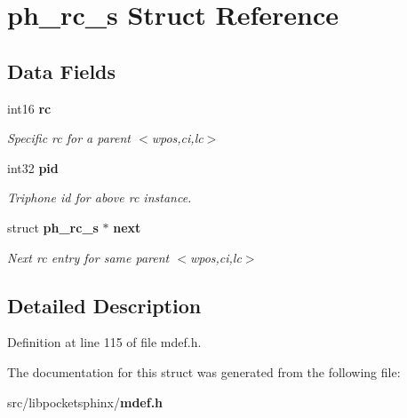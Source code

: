 \section{ph\-\_\-rc\-\_\-s Struct Reference}
\label{structph__rc__s}
\subsection*{Data Fields}
\begin{DoxyCompactItemize}
\item 
int16 {\bf rc}\label{structph__rc__s_ab0f0852e254c04a1cb11de805b698733}

\begin{DoxyCompactList}\small\item\em Specific rc for a parent $<$wpos,ci,lc$>$ \end{DoxyCompactList}\item 
int32 {\bf pid}\label{structph__rc__s_a9762d0f7b4b9f284fd2b3ff735b4256b}

\begin{DoxyCompactList}\small\item\em Triphone id for above rc instance. \end{DoxyCompactList}\item 
struct {\bf ph\-\_\-rc\-\_\-s} $\ast$ {\bf next}\label{structph__rc__s_ae05aead721c5cfdd27ac90378bb80f3c}

\begin{DoxyCompactList}\small\item\em Next rc entry for same parent $<$wpos,ci,lc$>$ \end{DoxyCompactList}\end{DoxyCompactItemize}


\subsection{Detailed Description}


Definition at line 115 of file mdef.\-h.



The documentation for this struct was generated from the following file\-:\begin{DoxyCompactItemize}
\item 
src/libpocketsphinx/{\bf mdef.\-h}\end{DoxyCompactItemize}

